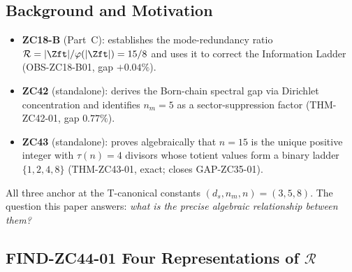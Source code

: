 \documentclass[12pt, a4paper]{article}
\providecommand{\nm}{n_m}
\providecommand{\ds}{d_s}
\providecommand{\phitot}{\varphi}
\providecommand{\Rcal}{\mathcal{R}}
\begin{document}
\tableofcontents
\newpage

\subsection{Background and Motivation}


\begin{keybox}[title={What Three Papers Share}]
\begin{itemize}[leftmargin=*, itemsep=2pt]
\item \textbf{ZC18-B} (Part~C): establishes the mode-redundancy
  ratio $\Rcal = |\Zft|/\phitot(|\Zft|) = 15/8$ and uses it
  to correct the Information Ladder
  (OBS-ZC18-B01, gap $+0.04\%$).
\item \textbf{ZC42} (standalone): derives the Born-chain spectral
  gap via Dirichlet concentration and identifies $\nm = 5$
  as a sector-suppression factor
  (THM-ZC42-01, gap $0.77\%$).
\item \textbf{ZC43} (standalone): proves algebraically that
  $n = 15$ is the unique positive integer with $\tau(n) = 4$
  divisors whose totient values form a binary ladder
  $\{1, 2, 4, 8\}$ (THM-ZC43-01, exact; closes GAP-ZC35-01).
\end{itemize}
All three anchor at the T-canonical constants
$(\ds, \nm, n) = (3, 5, 8)$.
The question this paper answers: \emph{what is the
precise algebraic relationship between them?}
\end{keybox}

\subsection{FIND-ZC44-01 \quad Four Representations of \texorpdfstring{$\mathcal{R}$}{R}}

\end{document}
